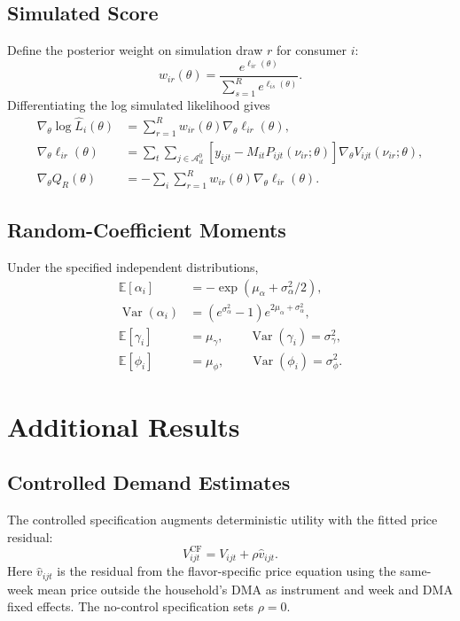 \documentclass[12pt]{article}
\theoremstyle{definition}
\theoremstyle{remark}
\newcommand{\E}{\mathbb{E}}
\newcommand{\Var}{\operatorname{Var}}
\begin{document}
\subsection{Simulated Score}
Define the posterior weight on simulation draw $r$ for consumer $i$:
\begin{equation}
 w_{ir}(\theta)=\frac{e^{\ell_{ir}(\theta)}}{\sum_{s=1}^Re^{\ell_{is}(\theta)}}.
\end{equation}
Differentiating the log simulated likelihood gives
\begin{align}
 \nabla_\theta\log\widehat L_i(\theta)
 &=\sum_{r=1}^R w_{ir}(\theta)\nabla_\theta\ell_{ir}(\theta),\\
 \nabla_\theta\ell_{ir}(\theta)
 &=\sum_t\sum_{j\in\mathcal A_{it}^0}
 [y_{ijt}-M_{it}P_{ijt}(\nu_{ir};\theta)]
 \nabla_\theta V_{ijt}(\nu_{ir};\theta),\\
 \nabla_\theta Q_R(\theta)
 &=-\sum_i\sum_{r=1}^R w_{ir}(\theta)\nabla_\theta\ell_{ir}(\theta).
\end{align}

\subsection{Random-Coefficient Moments}
Under the specified independent distributions,
\begin{align}
 \E[\alpha_i]&=-\exp(\mu_\alpha+\sigma_\alpha^2/2),\\
 \Var(\alpha_i)&=(e^{\sigma_\alpha^2}-1)e^{2\mu_\alpha+\sigma_\alpha^2},\\
 \E[\gamma_i]&=\mu_\gamma,\qquad \Var(\gamma_i)=\sigma_\gamma^2,\\
 \E[\phi_i]&=\mu_\phi,\qquad \Var(\phi_i)=\sigma_\phi^2.
\end{align}



\section{Additional Results}
\label{app:results}

\subsection{Controlled Demand Estimates}
The controlled specification augments deterministic utility with the fitted
price residual:
\begin{equation}
 V_{ijt}^{\mathrm{CF}}=V_{ijt}+\rho\widehat v_{ijt}.
\end{equation}
Here $\widehat v_{ijt}$ is the residual from the flavor-specific price equation
using the same-week mean price outside the household's DMA as instrument and
week and DMA fixed effects. The no-control specification sets $\rho=0$.

\FloatBarrier
\end{document}
